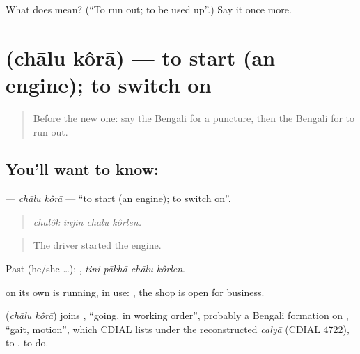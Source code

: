 \begin{tcolorbox}[breakable,colback=teal!4,colframe=teal!35!black,title={Before you move on}]
What does  mean? (\textquotedblleft{}To run out; to be used up\textquotedblright{}.) Say it once more.
\end{tcolorbox}
\section[\texorpdfstring{\bn{চালু} \bn{করা} (chālu kôrā)}{চালু করা (chālu kôrā)}]{  (chālu kôrā) — to start (an engine); to switch on}

\label{lesson:BN-C393-chalu-kora}



\begin{quote}
Before the new one: say the Bengali for a puncture, then the Bengali for to run out.
\end{quote}

\subsection*{You'll want to know:  }
\textbf{ } — \emph{chālu kôrā} — \textquotedblleft{}to start (an engine); to switch on\textquotedblright{}.

\begin{quote}
   
\end{quote}

\begin{quote}
\emph{chālôk injin chālu kôrlen.}
\end{quote}

\begin{quote}
The driver started the engine.
\end{quote}

Past (he/she …):    , \emph{tini pākhā chālu kôrlen}.

 on its own is running, in use:  , the shop is open for business.

\begin{cousinweb}
\textbf{ } (\emph{chālu kôrā}) joins , \textquotedblleft{}going, in working order\textquotedblright{}, probably a Bengali formation on , \textquotedblleft{}gait, motion\textquotedblright{}, which CDIAL lists under the reconstructed \emph{calyā} (CDIAL 4722), to , to do.
\end{cousinweb}

